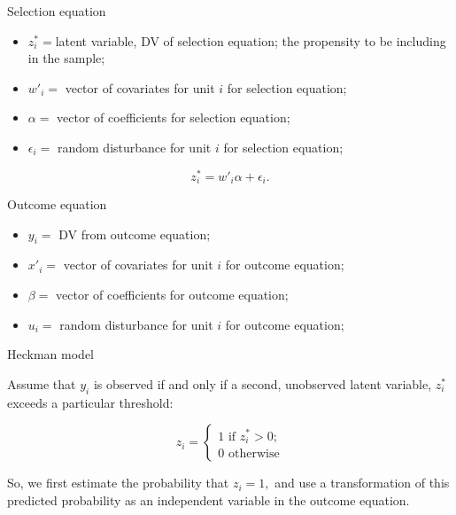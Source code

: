 \documentclass[10pt,ignorenonframetext,]{beamer}
\providecommand{\tightlist}{%
\setlength{\itemsep}{0pt}\setlength{\parskip}{0pt}}
\begin{document}
\begin{frame}{Selection equation}

\begin{itemize}
\tightlist
\item
  \(z^*_i =\)latent variable, DV of selection equation; the propensity
  to be including in the sample;
\item
  \(w'_i =\) vector of covariates for unit \(i\) for selection equation;
\item
  \(\alpha =\) vector of coefficients for selection equation;
\item
  \(\epsilon_i =\) random disturbance for unit \(i\) for selection
  equation;
\end{itemize}

\[
z^*_i = w'_i \alpha + \epsilon_i.
\]

\Large Outcome equation

\normalsize

\begin{itemize}
\tightlist
\item
  \(y_i =\) DV from outcome equation;
\item
  \(x'_i =\) vector of covariates for unit \(i\) for outcome equation;
\item
  \(\beta =\) vector of coefficients for outcome equation;
\item
  \(u_i =\) random disturbance for unit \(i\) for outcome equation;
\end{itemize}

\end{frame}

\begin{frame}{Heckman model}

Assume that \(y_i\) is observed if and only if a second, unobserved
latent variable, \(z^*_i\) exceeds a particular threshold:

\[
z_i = \left\{ \begin{aligned}
  1 \text{ if } z^*_i > 0; \\
  0 \text{ otherwise}
\end{aligned}\right.
\]

So, we first estimate the probability that \(z_i = 1,\) and use a
transformation of this predicted probability as an independent variable
in the outcome equation.

\end{frame}
\end{document}
